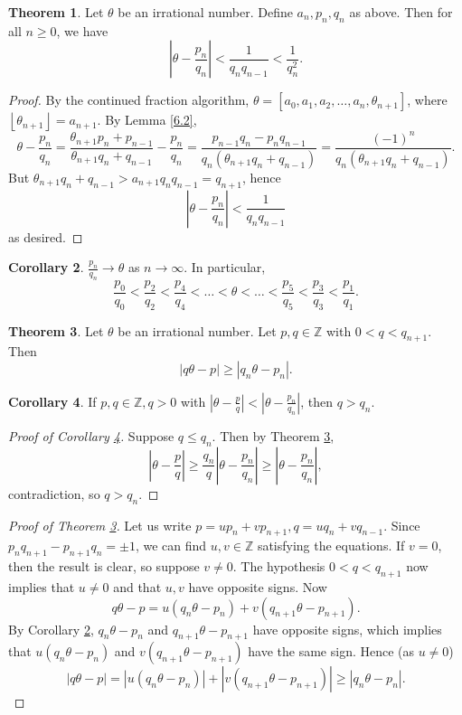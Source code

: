 \documentclass{article}
\theoremstyle{definition}
\newtheorem{theorem}{Theorem}[section]
\newtheorem{cor}[theorem]{Corollary}
\begin{document}
\begin{theorem}\label{6.4}
    Let $\theta$ be an irrational number. Define $a_n,p_n,q_n$ as above. Then for all $n\ge 0$, we have
    \[
    \left|\theta - \frac{p_n}{q_n}\right| < \frac{1}{q_nq_{n-1}} < \frac{1}{q_n^2}.
    \]
\end{theorem}
\begin{proof}
    By the continued fraction algorithm, $\theta = [a_0,a_1,a_2,\ldots,a_n,\theta_{n+1}]$, where $\left\lfloor \theta_{n+1} \right\rfloor=a_{n+1}$. By Lemma \ref{6.2},
    \[
    \theta - \frac{p_n}{q_n}= \frac{\theta_{n+1} p_n + p_{n-1}}{\theta_{n+1} q_n + q_{n-1}} - \frac{p_n}{q_n} = \frac{p_{n-1}q_n-p_nq_{n-1}}{q_n(\theta_{n+1}q_n+q_{n-1})} = \frac{(-1)^n}{q_n(\theta_{n+1}q_n+q_{n-1})}.
    \]
    But $\theta_{n+1}q_n+q_{n-1} > a_{n+1}q_nq_{n-1} = q_{n+1}$, hence
    \[
        \left|\theta - \frac{p_n}{q_n}\right| < \frac{1}{q_nq_{n-1}}
    \]
    as desired.
\end{proof}
\begin{cor}\label{6.5}
    $\frac{p_n}{q_n}\to \theta$ as $n \to \infty$. In particular,
    \[
        \frac{p_0}{q_0}<\frac{p_2}{q_2}<\frac{p_4}{q_4}<\ldots < \theta < \ldots< \frac{p_5}{q_5}<\frac{p_3}{q_3}<\frac{p_1}{q_1}.
    \]
\end{cor}
\begin{theorem}\label{6.6}
    Let $\theta$ be an irrational number. Let $p,q \in \mathbb{Z}$ with $0<q<q_{n+1}$. Then \[
    |q \theta - p| \ge |q_n \theta - p_n|.
    \]
\end{theorem}
\begin{cor}\label{6.7}
    If $p,q \in\mathbb{Z}, q>0$ with $|\theta-\frac{p}{q}|<|\theta-\frac{p_n}{q_n}|$, then $q>q_n$.
\end{cor}
\begin{proof}[Proof of Corollary \ref{6.7}]
    Suppose $q\le q_n$. Then by Theorem \ref{6.6}, \[
    \left|\theta-\frac{p}{q}\right| \ge \frac{q_n}{q} \left|\theta-\frac{p_n}{q_n}\right| \ge \left|\theta-\frac{p_n}{q_n}\right|,
    \]
    contradiction, so $q>q_n$.
\end{proof}
\begin{proof}[Proof of Theorem \ref{6.6}]
    Let us write $p = u p_n + v p_{n+1}, q=uq_n+vq_{n-1}$. Since $p_nq_{n+1}-p_{n+1}q_n = \pm 1$, we can find $u,v \in \mathbb{Z}$ satisfying the equations. If $v=0$, then the result is clear, so suppose $v \neq 0$. The hypothesis $0<q<q_{n+1}$ now implies that $u\neq 0$ and that $u,v$ have opposite signs. Now $$q \theta - p  = u(q_n \theta - p_n) + v (q_{n+1} \theta - p_{n+1}).$$
    By Corollary \ref{6.5}, $q_{n} \theta - p_n$ and $q_{n+1} \theta - p_{n+1}$ have opposite signs, which implies that $u (q_n \theta - p_n)$ and $v(q_{n+1}\theta - p_{n+1})$ have the same sign. Hence (as $u\neq 0$) \[
    |q \theta - p| = |u(q_n \theta - p_n)| + |v(q_{n+1}\theta - p_{n+1})|\ge |q_n \theta - p_n|.
    \]
\end{proof}
\end{document}
